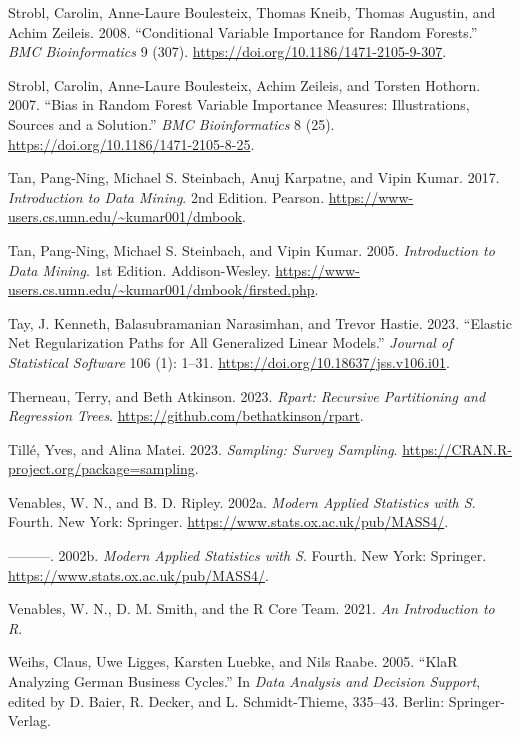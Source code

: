 \documentclass[
  notitlepage]{book}
\newlength{\cslhangindent}
\newenvironment{cslreferences}%
  {\setlength{\parindent}{0pt}%
  \everypar{\setlength{\hangindent}{\cslhangindent}}\ignorespaces}%
  {\par}
\begin{document}
\begin{cslreferences}
\leavevmode\hypertarget{ref-party2008b}{}%
Strobl, Carolin, Anne-Laure Boulesteix, Thomas Kneib, Thomas Augustin, and Achim Zeileis. 2008. ``Conditional Variable Importance for Random Forests.'' \emph{BMC Bioinformatics} 9 (307). \url{https://doi.org/10.1186/1471-2105-9-307}.

\leavevmode\hypertarget{ref-party2007a}{}%
Strobl, Carolin, Anne-Laure Boulesteix, Achim Zeileis, and Torsten Hothorn. 2007. ``Bias in Random Forest Variable Importance Measures: Illustrations, Sources and a Solution.'' \emph{BMC Bioinformatics} 8 (25). \url{https://doi.org/10.1186/1471-2105-8-25}.

\leavevmode\hypertarget{ref-Tan2018}{}%
Tan, Pang-Ning, Michael S. Steinbach, Anuj Karpatne, and Vipin Kumar. 2017. \emph{Introduction to Data Mining}. 2nd Edition. Pearson. \url{https://www-users.cs.umn.edu/~kumar001/dmbook}.

\leavevmode\hypertarget{ref-Tan2005}{}%
Tan, Pang-Ning, Michael S. Steinbach, and Vipin Kumar. 2005. \emph{Introduction to Data Mining}. 1st Edition. Addison-Wesley. \url{https://www-users.cs.umn.edu/~kumar001/dmbook/firsted.php}.

\leavevmode\hypertarget{ref-glmnet2023}{}%
Tay, J. Kenneth, Balasubramanian Narasimhan, and Trevor Hastie. 2023. ``Elastic Net Regularization Paths for All Generalized Linear Models.'' \emph{Journal of Statistical Software} 106 (1): 1--31. \url{https://doi.org/10.18637/jss.v106.i01}.

\leavevmode\hypertarget{ref-R-rpart}{}%
Therneau, Terry, and Beth Atkinson. 2023. \emph{Rpart: Recursive Partitioning and Regression Trees}. \url{https://github.com/bethatkinson/rpart}.

\leavevmode\hypertarget{ref-R-sampling}{}%
Tillé, Yves, and Alina Matei. 2023. \emph{Sampling: Survey Sampling}. \url{https://CRAN.R-project.org/package=sampling}.

\leavevmode\hypertarget{ref-MASS2002}{}%
Venables, W. N., and B. D. Ripley. 2002a. \emph{Modern Applied Statistics with S}. Fourth. New York: Springer. \url{https://www.stats.ox.ac.uk/pub/MASS4/}.

\leavevmode\hypertarget{ref-nnet2002}{}%
---------. 2002b. \emph{Modern Applied Statistics with S}. Fourth. New York: Springer. \url{https://www.stats.ox.ac.uk/pub/MASS4/}.

\leavevmode\hypertarget{ref-RCore2021}{}%
Venables, W. N., D. M. Smith, and the R Core Team. 2021. \emph{An Introduction to R}.

\leavevmode\hypertarget{ref-klaR2005}{}%
Weihs, Claus, Uwe Ligges, Karsten Luebke, and Nils Raabe. 2005. ``KlaR Analyzing German Business Cycles.'' In \emph{Data Analysis and Decision Support}, edited by D. Baier, R. Decker, and L. Schmidt-Thieme, 335--43. Berlin: Springer-Verlag.


\end{cslreferences}
\end{document}
